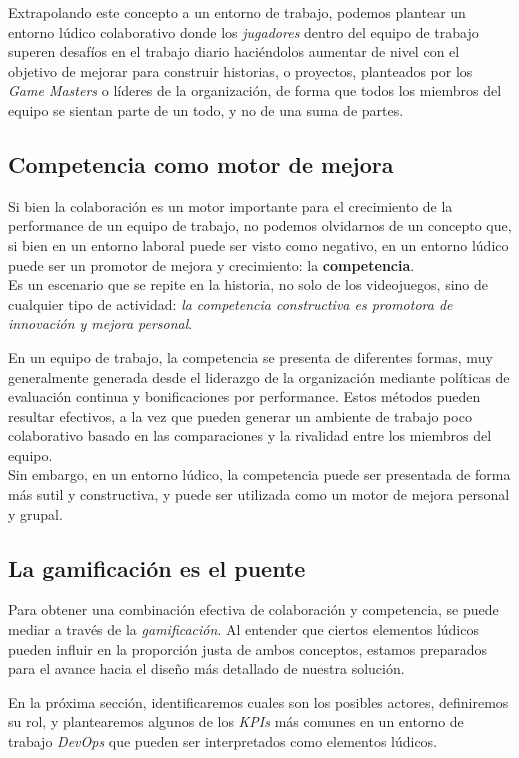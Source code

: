 \documentclass[journal]{IEEEtran}
\begin{document}
Extrapolando este concepto a un entorno de trabajo, podemos plantear un entorno lúdico colaborativo donde los \textit{jugadores} dentro del equipo de trabajo superen desafíos en el trabajo diario haciéndolos aumentar de nivel con el objetivo de mejorar para construir historias, o proyectos, planteados por los \textit{Game Masters} o líderes de la organización, de forma que todos los miembros del equipo se sientan parte de un todo, y no de una suma de partes.

\subsection{\textbf{Competencia como motor de mejora}}
Si bien la colaboración es un motor importante para el crecimiento de la performance de un equipo de trabajo, no podemos olvidarnos de un concepto que, si bien en un entorno laboral puede ser visto como negativo, en un entorno lúdico puede ser un promotor de mejora y crecimiento: la \textbf{competencia}.
\\Es un escenario que se repite en la historia, no solo de los videojuegos, sino de cualquier tipo de actividad: \textit{la competencia constructiva es promotora de innovación y mejora personal}.

En un equipo de trabajo, la competencia se presenta de diferentes formas, muy generalmente generada desde el liderazgo de la organización mediante políticas de evaluación continua y bonificaciones por performance. Estos métodos pueden resultar efectivos, a la vez que pueden generar un ambiente de trabajo poco colaborativo basado en las comparaciones y la rivalidad entre los miembros del equipo.
\\Sin embargo, en un entorno lúdico, la competencia puede ser presentada de forma más sutil y constructiva, y puede ser utilizada como un motor de mejora personal y grupal.

\subsection{\textbf{La gamificación es el puente}}
Para obtener una combinación efectiva de colaboración y competencia, se puede mediar a través de la \textit{gamificación}. Al entender que ciertos elementos lúdicos pueden influir en la proporción justa de ambos conceptos, estamos preparados para el avance hacia el diseño más detallado de nuestra solución.

En la próxima sección, identificaremos cuales son los posibles actores, definiremos su rol, y plantearemos algunos de los \textit{KPIs} más comunes en un entorno de trabajo \textit{DevOps} que pueden ser interpretados como elementos lúdicos.
\end{document}
